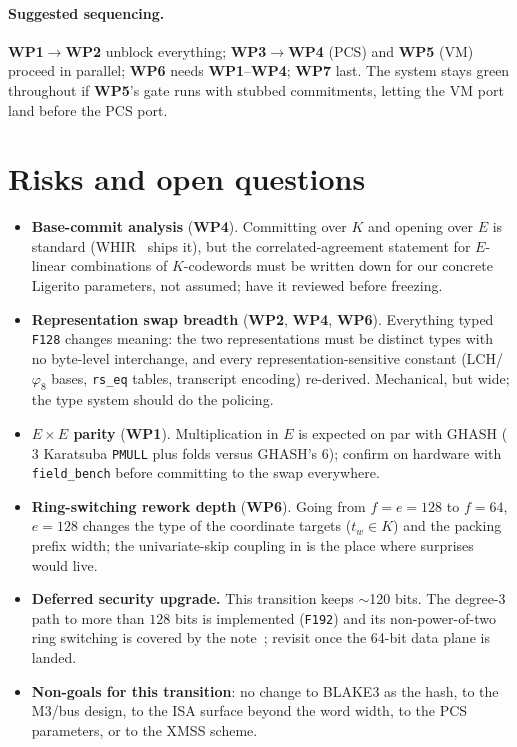 \documentclass[11pt]{article}
\newcommand{\K}{K}            %
\newcommand{\E}{E}            %
\newcommand{\WP}[1]{\textbf{WP#1}}
\begin{document}
\paragraph{Suggested sequencing.} \WP1$\to$\WP2 unblock everything;
\WP3$\to$\WP4 (PCS) and \WP5 (VM) proceed in parallel; \WP6 needs
\WP1--\WP4; \WP7 last. The system stays green throughout if \WP5's gate
runs with stubbed commitments, letting the VM port land before the PCS
port.

\section{Risks and open questions}\label{sec:risks}

\begin{itemize}
\item \textbf{Base-commit analysis} (\WP4). Committing over $\K$ and
  opening over $\E$ is standard (WHIR~\cite{whir} ships it), but the
  correlated-agreement statement for $\E$-linear combinations of
  $\K$-codewords must be written down for our concrete Ligerito
  parameters, not assumed; have it reviewed before freezing.
\item \textbf{Representation swap breadth} (\WP2, \WP4, \WP6). Everything
  typed \texttt{F128} changes meaning: the two representations
  must be distinct types with no byte-level interchange, and every
  representation-sensitive constant (LCH/$\varphi_8$ bases,
  \texttt{rs\_eq} tables, transcript encoding) re-derived. Mechanical, but
  wide; the type system should do the policing.
\item \textbf{$\E\times\E$ parity} (\WP1). Multiplication in $\E$ is expected
  on par with GHASH ($3$ Karatsuba \texttt{PMULL} plus folds versus
  GHASH's $6$); confirm on hardware with \texttt{field\_bench} before
  committing to the swap everywhere.
\item \textbf{Ring-switching rework depth} (\WP6). Going from $f=e=128$ to
  $f=64$, $e=128$ changes the type of the coordinate targets ($t_w\in\K$)
  and the packing prefix width; the univariate-skip coupling in
   is the place where surprises would live.
\item \textbf{Deferred security upgrade.} This transition keeps
  $\sim$120 bits. The degree-3 path to more than $128$ bits is implemented
  (\texttt{F192}) and its non-power-of-two ring switching is covered by
  the note~\cite{rsgen}; revisit once the 64-bit data plane is landed.
\item \textbf{Non-goals for this transition}: no change to BLAKE3 as the
  hash, to the M3/bus design, to the ISA surface beyond the word width,
  to the PCS parameters, or to the XMSS scheme.
\end{itemize}
\end{document}
